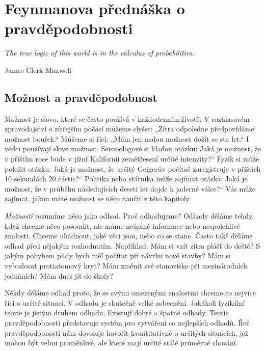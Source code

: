 \graphicspath{{../src/FYZ/img/}}
\setchaptertoc
\chapter{Feynmanova přednáška o pravděpodobnosti}\label{chap:fey_ppst}
\epigraph{\emph{The true logic of this world is in the calculus of probabilities.}}{James Clerk 
Maxwell}
  \section{Možnost a pravděpodobnost}
    Možnost je slovo, které se často používá v každodenním životě. V rozhlasovém zpravodajství o 
    zítřejším počasí můžeme slyšet: „Zítra odpoledne předpovídáme možnost bouřek.“ Můžeme si říci: 
    „Mám jen malou možnost dožít se sta let.“ I vědci používají slovo možnost. Seismologové si 
    kladou otázku: Jaká je možnost, že v příštím roce bude v jižní Kalifornii zemětřesení určité 
    intenzity?“ Fyzik si může položit otázku: Jaká je možnost, že určitý Geigerův počítač 
    zaregistruje v příštích \num{10} sekundách \num{20} částic?“ Politika nebo státníka může 
    zajímat otázka: Jaká je možnost, že v průběhu následujících deseti let dojde k jaderné válce?“ 
    Vás může zajímat, jakou máte možnost se něco naučit z této kapitoly.
    
    \emph{Možností} rozumíme něco jako odhad. Proč odhadujeme? Odhady děláme tehdy, když chceme 
    něco posoudit, ale máme neúplné informace nebo nespolehlivé znalosti. Chceme uhádnout, jaké 
    věci jsou, nebo co se stane. Často také děláme odhad před nějakým rozhodnutím. Například: Mám 
    si vzít zítra plášť do deště? S jakým pohybem půdy bych měl počítat při návrhu nové stavby? Mám 
    si vybudovat protiatomový kryt? Mám změnit své stanovisko při mezinárodních jednáních? Mám dnes 
    jít do školy?
    
    Někdy děláme odhad proto, že se svými omezenými znalostmi chceme co nejvíce říci o určité 
    situaci. V odhadu je skutečně velké zobecnění. Jakákoli fyzikální teorie je jistým druhem 
    odhadu. Existují dobré a špatné odhady. Teorie pravděpodobnosti představuje systém pro     
    vytváření co nejlepších odhadů. Řeč pravděpodobnosti nám dovoluje hovořit kvantitativně o 
    určitých situacích, jež mohou být velmi proměnlivé, ale které mají určité stálé průměrné 
    chování.
    
